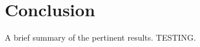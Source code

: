 \documentclass[12pt,letterpaper]{article}       %
\begin{document}
\section{Conclusion}

A brief summary of the pertinent results. TESTING.



\end{document}
